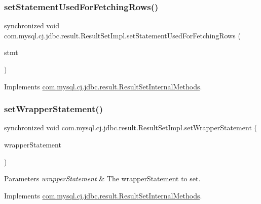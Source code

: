 \subsubsection{\texorpdfstring{set\+Statement\+Used\+For\+Fetching\+Rows()}{setStatementUsedForFetchingRows()}}
{\footnotesize\ttfamily synchronized void com.\+mysql.\+cj.\+jdbc.\+result.\+Result\+Set\+Impl.\+set\+Statement\+Used\+For\+Fetching\+Rows (\begin{DoxyParamCaption}\item[{\mbox{\hyperlink{interfacecom_1_1mysql_1_1cj_1_1jdbc_1_1_jdbc_prepared_statement}{Jdbc\+Prepared\+Statement}}}]{stmt }\end{DoxyParamCaption})}



Implements \mbox{\hyperlink{interfacecom_1_1mysql_1_1cj_1_1jdbc_1_1result_1_1_result_set_internal_methods_ae1258b1e6de19952cd438a340122cc81}{com.\+mysql.\+cj.\+jdbc.\+result.\+Result\+Set\+Internal\+Methods}}.

\mbox{\label{classcom_1_1mysql_1_1cj_1_1jdbc_1_1result_1_1_result_set_impl_a554db0f910df92f690ce667a5e5b5000}} 
\subsubsection{\texorpdfstring{set\+Wrapper\+Statement()}{setWrapperStatement()}}
{\footnotesize\ttfamily synchronized void com.\+mysql.\+cj.\+jdbc.\+result.\+Result\+Set\+Impl.\+set\+Wrapper\+Statement (\begin{DoxyParamCaption}\item[{java.\+sql.\+Statement}]{wrapper\+Statement }\end{DoxyParamCaption})}


\begin{DoxyParams}{Parameters}
{\em wrapper\+Statement} & The wrapper\+Statement to set. \\
\hline
\end{DoxyParams}


Implements \mbox{\hyperlink{interfacecom_1_1mysql_1_1cj_1_1jdbc_1_1result_1_1_result_set_internal_methods_aeaa719d2c55d3e0c32bd5b47b4020009}{com.\+mysql.\+cj.\+jdbc.\+result.\+Result\+Set\+Internal\+Methods}}.

